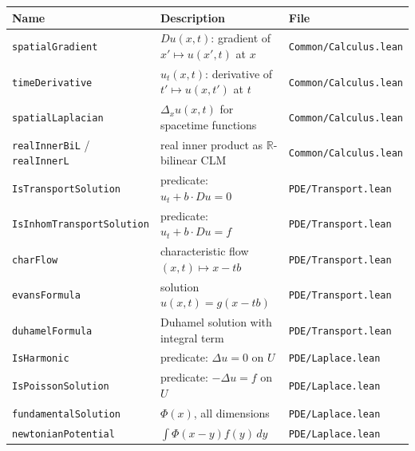 ﻿\documentclass[12pt, a4paper]{article}
\renewcommand{\_}{\origunderscore\allowbreak}
\theoremstyle{definition}
\theoremstyle{plain}
\begin{document}
\begin{longtable}{@{}L{4.5cm}L{6.8cm}L{3.5cm}@{}}
  \toprule
  \textbf{Name} & \textbf{Description} & \textbf{File} \\
  \midrule
  \endhead
  \texttt{spatialGradient}          & $Du(x,t)$: gradient of $x'\mapsto u(x',t)$ at $x$  & \texttt{Common/\allowbreak Calculus.\allowbreak lean} \\
  \texttt{timeDerivative}           & $u_t(x,t)$: derivative of $t'\mapsto u(x,t')$ at $t$ & \texttt{Common/\allowbreak Calculus.\allowbreak lean} \\
  \texttt{spatialLaplacian}         & $\Delta_x u(x,t)$ for spacetime functions           & \texttt{Common/\allowbreak Calculus.\allowbreak lean} \\
  \texttt{realInnerBiL} / \texttt{realInnerL} & real inner product as $\mathbb{R}$-bilinear CLM & \texttt{Common/\allowbreak Calculus.\allowbreak lean} \\
  \texttt{IsTransportSolution}      & predicate: $u_t + b \cdot Du = 0$                   & \texttt{PDE/\allowbreak Transport.\allowbreak lean} \\
  \texttt{IsInhomTransportSolution} & predicate: $u_t + b \cdot Du = f$                   & \texttt{PDE/\allowbreak Transport.\allowbreak lean} \\
  \texttt{charFlow}                 & characteristic flow $(x,t) \mapsto x - tb$          & \texttt{PDE/\allowbreak Transport.\allowbreak lean} \\
  \texttt{evansFormula}             & solution $u(x,t) = g(x-tb)$                         & \texttt{PDE/\allowbreak Transport.\allowbreak lean} \\
  \texttt{duhamelFormula}           & Duhamel solution with integral term                 & \texttt{PDE/\allowbreak Transport.\allowbreak lean} \\
  \texttt{IsHarmonic}               & predicate: $\Delta u = 0$ on $U$                    & \texttt{PDE/\allowbreak Laplace.\allowbreak lean} \\
  \texttt{IsPoissonSolution}        & predicate: $-\Delta u = f$ on $U$                   & \texttt{PDE/\allowbreak Laplace.\allowbreak lean} \\
  \texttt{fundamentalSolution}      & $\Phi(x)$, all dimensions                           & \texttt{PDE/\allowbreak Laplace.\allowbreak lean} \\
  \texttt{newtonianPotential}       & $\int \Phi(x-y) f(y)\,dy$                           & \texttt{PDE/\allowbreak Laplace.\allowbreak lean} \\

\end{longtable}
\end{document}
